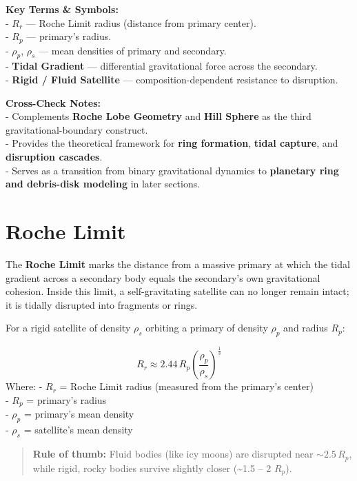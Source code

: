 \documentclass[
  letterpaper,
]{book}
\begin{document}
\textbf{Key Terms \& Symbols:}\\
- \textbf{\(R_r\)} --- Roche Limit radius (distance from primary
center).\\
- \textbf{\(R_p\)} --- primary's radius.\\
- \textbf{\(\rho_p\)}, \textbf{\(\rho_s\)} --- mean densities of primary
and secondary.\\
- \textbf{Tidal Gradient} --- differential gravitational force across
the secondary.\\
- \textbf{Rigid / Fluid Satellite} --- composition-dependent resistance
to disruption.

\textbf{Cross-Check Notes:}\\
- Complements \textbf{Roche Lobe Geometry} and \textbf{Hill Sphere} as
the third gravitational-boundary construct.\\
- Provides the theoretical framework for \textbf{ring formation},
\textbf{tidal capture}, and \textbf{disruption cascades}.\\
- Serves as a transition from binary gravitational dynamics to
\textbf{planetary ring and debris-disk modeling} in later sections.

\section{Roche Limit}\label{roche-limit}

The \textbf{Roche Limit} marks the distance from a massive primary at
which the tidal gradient across a secondary body equals the secondary's
own gravitational cohesion. Inside this limit, a self-gravitating
satellite can no longer remain intact; it is tidally disrupted into
fragments or rings.

For a rigid satellite of density \(\rho_s\) orbiting a primary of
density \(\rho_p\) and radius \(R_p\):

\[
R_r \approx 2.44\,R_p
\left(
  \frac{\rho_p}{\rho_s}
\right)^{\!\tfrac{1}{3}}
\] Where: - \(R_r\) = Roche Limit radius (measured from the primary's
center)\\
- \(R_p\) = primary's radius\\
- \(\rho_p\) = primary's mean density\\
- \(\rho_s\) = satellite's mean density

\begin{quote}
\textbf{Rule of thumb:} Fluid bodies (like icy moons) are disrupted near
\(\sim 2.5\,R_p\), while rigid, rocky bodies survive slightly closer
(\textasciitilde1.5 -- 2 \(R_p\)).
\end{quote}
\end{document}
